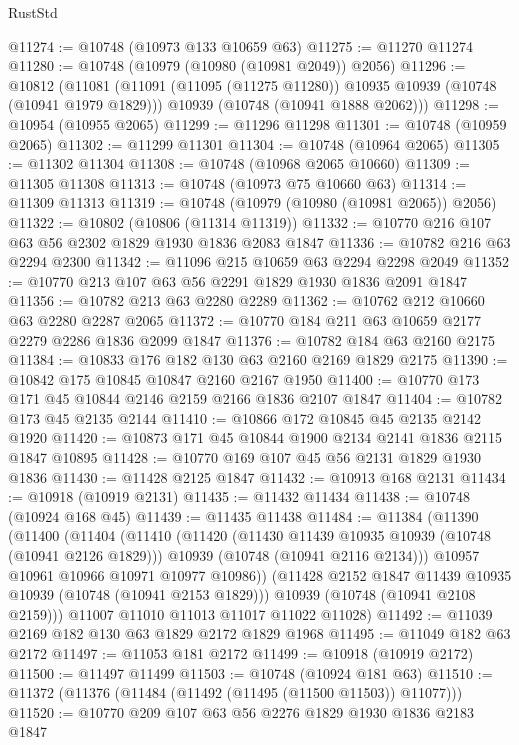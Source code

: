 \begin{lexlean}{RustStd}
\begin{coremodule}
@11274 := @10748 (@10973 @133 @10659 @63)
@11275 := @11270 @11274
@11280 := @10748 (@10979 (@10980 (@10981 @2049)) @2056)
@11296 := @10812
    (@11081
      (@11091 (@11095 (@11275 @11280)) @10935 @10939 (@10748 (@10941 @1979 @1829)))
      @10939
      (@10748 (@10941 @1888 @2062)))
@11298 := @10954 (@10955 @2065)
@11299 := @11296 @11298
@11301 := @10748 (@10959 @2065)
@11302 := @11299 @11301
@11304 := @10748 (@10964 @2065)
@11305 := @11302 @11304
@11308 := @10748 (@10968 @2065 @10660)
@11309 := @11305 @11308
@11313 := @10748 (@10973 @75 @10660 @63)
@11314 := @11309 @11313
@11319 := @10748 (@10979 (@10980 (@10981 @2065)) @2056)
@11322 := @10802 (@10806 (@11314 @11319))
@11332 := @10770 @216 @107 @63 @56 @2302 @1829 @1930 @1836 @2083 @1847
@11336 := @10782 @216 @63 @2294 @2300
@11342 := @11096 @215 @10659 @63 @2294 @2298 @2049
@11352 := @10770 @213 @107 @63 @56 @2291 @1829 @1930 @1836 @2091 @1847
@11356 := @10782 @213 @63 @2280 @2289
@11362 := @10762 @212 @10660 @63 @2280 @2287 @2065
@11372 := @10770 @184 @211 @63 @10659 @2177 @2279 @2286 @1836 @2099 @1847
@11376 := @10782 @184 @63 @2160 @2175
@11384 := @10833 @176 @182 @130 @63 @2160 @2169 @1829 @2175
@11390 := @10842 @175 @10845 @10847 @2160 @2167 @1950
@11400 := @10770 @173 @171 @45 @10844 @2146 @2159 @2166 @1836 @2107 @1847
@11404 := @10782 @173 @45 @2135 @2144
@11410 := @10866 @172 @10845 @45 @2135 @2142 @1920
@11420 := @10873 @171 @45 @10844 @1900 @2134 @2141 @1836 @2115 @1847 @10895
@11428 := @10770 @169 @107 @45 @56 @2131 @1829 @1930 @1836
@11430 := @11428 @2125 @1847
@11432 := @10913 @168 @2131
@11434 := @10918 (@10919 @2131)
@11435 := @11432 @11434
@11438 := @10748 (@10924 @168 @45)
@11439 := @11435 @11438
@11484 := @11384
    (@11390
      (@11400
        (@11404
          (@11410
            (@11420
              (@11430 @11439 @10935 @10939 (@10748 (@10941 @2126 @1829)))
              @10939
              (@10748 (@10941 @2116 @2134)))
            @10957
            @10961
            @10966
            @10971
            @10977
            @10986))
        (@11428 @2152 @1847 @11439 @10935 @10939 (@10748 (@10941 @2153 @1829)))
        @10939
        (@10748 (@10941 @2108 @2159)))
      @11007
      @11010
      @11013
      @11017
      @11022
      @11028)
@11492 := @11039 @2169 @182 @130 @63 @1829 @2172 @1829 @1968
@11495 := @11049 @182 @63 @2172
@11497 := @11053 @181 @2172
@11499 := @10918 (@10919 @2172)
@11500 := @11497 @11499
@11503 := @10748 (@10924 @181 @63)
@11510 := @11372 (@11376 (@11484 (@11492 (@11495 (@11500 @11503)) @11077)))
@11520 := @10770 @209 @107 @63 @56 @2276 @1829 @1930 @1836 @2183 @1847

\end{coremodule}
\end{lexlean}
